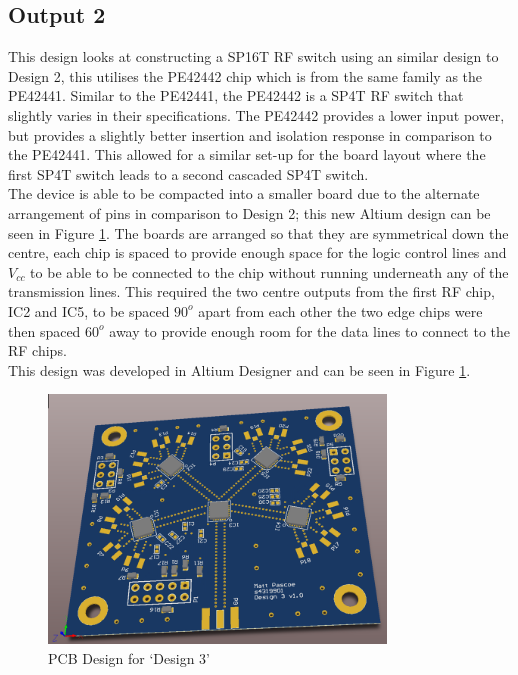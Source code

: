 \documentclass[12pt,openany,a4paper]{book}
\begin{document}
\subsection{Output 2}		\label{sec:output2}
This design looks at constructing a SP16T RF switch using an similar design to Design 2, this utilises the PE42442 chip which is from the same family as the PE42441. Similar to the PE42441, the PE42442 is a SP4T RF switch that slightly varies in their specifications. The PE42442 provides a lower input power, but provides a slightly better insertion and isolation response in comparison to the PE42441. This allowed for a similar set-up for the board layout where the first SP4T switch leads to a second cascaded SP4T switch.\\[0.2cm]
The device is able to be compacted into a smaller board due to the alternate arrangement of pins in comparison to Design 2; this new Altium design can be seen in Figure \ref{fig:design3}. The boards are arranged so that they are symmetrical down the centre, each chip is spaced to provide enough space for the logic control lines and $V_{cc}$ to be able to be connected to the chip without running underneath any of the transmission lines. This required the two centre outputs from the first RF chip, IC2 and IC5, to be spaced $90^o$ apart from each other the two edge chips were then spaced $60^o$ away to provide enough room for the data lines to connect to the RF chips.\\[0.2cm]
This design was developed in Altium Designer and can be seen in Figure \ref{fig:design3}.
\begin{figure}[H]
	\centering
    \includegraphics[width=0.8\textwidth]{design3_pcb.png}
	\caption{PCB Design for `Design 3'}
	\label{fig:design3}
\end{figure} 
\end{document}
